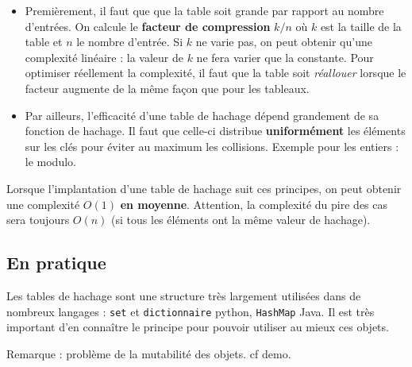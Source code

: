\documentclass{../cours}
\begin{document}
\begin{itemize}
\item Premièrement, il faut que que la table soit grande par rapport au nombre d'entrées. On calcule le \textbf{facteur de compression} $k/n$ où $k$ est la taille de la table et $n$ le nombre d'entrée. Si $k$ ne varie pas, on peut obtenir qu'une complexité linéaire : la valeur de $k$ ne fera varier que la constante. Pour optimiser réellement la complexité, il faut que la table soit \emph{réallouer} lorsque le facteur augmente de la même façon que pour les tableaux.

\item Par ailleurs, l'efficacité d'une table de hachage dépend grandement de sa fonction de hachage. Il faut que celle-ci distribue \textbf{uniformément} les éléments sur les clés pour éviter au maximum les collisions. Exemple pour les entiers : le modulo.
\end{itemize}

Lorsque l'implantation d'une table de hachage suit ces principes, on peut obtenir une complexité $O(1)$ \textbf{en moyenne}. Attention, la complexité du pire des cas sera toujours $O(n)$ (si tous les éléments ont la même valeur de hachage).

\subsection{En pratique}

Les tables de hachage sont une structure très largement utilisées dans de nombreux langages : {\tt set} et {\tt dictionnaire} python, {\tt HashMap} Java. Il est très important d'en connaître le principe pour pouvoir utiliser au mieux ces objets.

Remarque : problème de la mutabilité des objets. cf demo.
\end{document}
